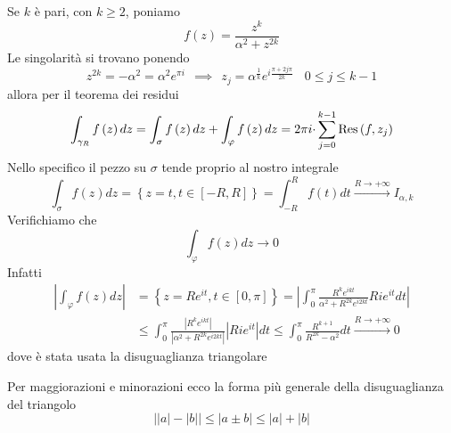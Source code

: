 Se $k$ è pari, con $k\geqslant 2$, poniamo
\begin{equation*}
f\left( z\right) =\frac{z^{k}}{\alpha ^{2} +z^{2k}}
\end{equation*}
Le singolarità si trovano ponendo
\begin{equation*}
z^{2k} =-\alpha ^{2} =\alpha ^{2} e^{\pi i} \ \ \implies \ \ z_{j} =\alpha ^{\frac{1}{k}} e^{i\frac{\pi +2j\pi }{2k}} \ \ \ \ 0\leqslant j\leqslant k-1
\end{equation*}
allora per il teorema dei residui
\begin{equation*}
\int _{\gamma _{R}} f\left( z\right) dz=\int _{\sigma } f\left( z\right) dz+\int _{\varphi } f\left( z\right) dz=2\pi i\cdotp \sum\limits ^{k-1}_{j=0}\operatorname{Res} \left( f,z_{j}\right)
\end{equation*}
Nello specifico il pezzo su $\sigma $ tende proprio al nostro integrale
\begin{equation*}
\int _{\sigma } f\left( z\right) dz=\left\{z=t,t\in \left[ -R,R\right]\right\} =\int ^{R}_{-R} f\left( t\right) dt\xrightarrow{R\rightarrow +\infty } I_{\alpha ,k}
\end{equation*}
Verifichiamo che
\begin{equation*}
\int _{\varphi } f\left( z\right) dz\rightarrow 0
\end{equation*}
Infatti
\begin{align*}
\left| \int _{\varphi } f\left( z\right) dz\right|  & =\left\{z=Re^{it} ,t\in \left[ 0,\pi \right]\right\} =\left| \int ^{\pi }_{0}\frac{R^{k} e^{ikt}}{\alpha ^{2} +R^{2k} e^{i2kt}} Rie^{it} dt\right| \\
 & \leqslant \int ^{\pi }_{0}\frac{\left| R^{k} e^{ikt}\right| }{\left| \alpha ^{2} +R^{2k} e^{i2kt}\right| }\left| Rie^{it}\right| dt\leqslant \int ^{\pi }_{0}\frac{R^{k+1}}{R^{2k} -\alpha ^{2}} dt\xrightarrow{R\rightarrow +\infty } 0
\end{align*}
dove è stata usata la disuguaglianza triangolare
\begin{rem}
 Per maggiorazioni e minorazioni ecco la forma più generale della disuguaglianza del triangolo
\begin{equation*}
\left| \left| a\right| -\left| b\right| \right| \leqslant \left| a\pm b\right| \leqslant \left| a\right| +\left| b\right| 
\end{equation*}
\end{rem}

